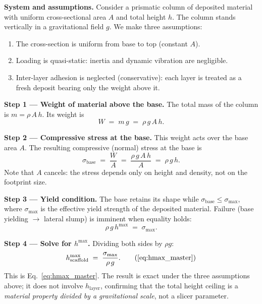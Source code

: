 \documentclass[11pt,a4paper]{article}
\begin{document}
\begin{derivationbox}[title={DERIVATION --- Self-weight force balance
for $h_\mathrm{scaffold}^{\max}$}]

\noindent\textbf{System and assumptions.}
Consider a prismatic column of deposited material with uniform
cross-sectional area $A$ and total height $h$.  The column stands
vertically in a gravitational field $g$.  We make three assumptions:
\begin{enumerate}[leftmargin=1.8em,itemsep=1pt]
  \item The cross-section is uniform from base to top (constant $A$).
  \item Loading is quasi-static: inertia and dynamic vibration are
    negligible.
  \item Inter-layer adhesion is neglected (conservative): each layer is
    treated as a fresh deposit bearing only the weight above it.
\end{enumerate}

\medskip\noindent\textbf{Step 1 --- Weight of material above the base.}
The total mass of the column is $m=\rho\,A\,h$.  Its weight is
\begin{equation}
W \;=\; m\,g \;=\; \rho\,g\,A\,h.
\end{equation}

\medskip\noindent\textbf{Step 2 --- Compressive stress at the base.}
This weight acts over the base area $A$.  The resulting compressive
(normal) stress at the base is
\begin{equation}
\sigma_\mathrm{base}
\;=\; \frac{W}{A}
\;=\; \frac{\rho\,g\,A\,h}{A}
\;=\; \rho\,g\,h.
\end{equation}
Note that $A$ cancels: the stress depends only on height and density,
not on the footprint size.

\medskip\noindent\textbf{Step 3 --- Yield condition.}
The base retains its shape while $\sigma_\mathrm{base}\leq\sigma_\mathrm{max}$,
where $\sigma_\mathrm{max}$ is the effective yield strength of the
deposited material.  Failure (base yielding $\to$ lateral slump) is
imminent when equality holds:
\begin{equation}
\rho\,g\,h^{\max} \;=\; \sigma_\mathrm{max}.
\end{equation}

\medskip\noindent\textbf{Step 4 --- Solve for $h^{\max}$.}
Dividing both sides by $\rho g$:
\begin{equation}
h_\mathrm{scaffold}^{\max}
\;=\; \frac{\sigma_\mathrm{max}}{\rho\,g}.
\tag{\ref{eq:hmax_master}}
\end{equation}
This is Eq.~\eqref{eq:hmax_master}.  The result is exact under the three
assumptions above; it does not involve $h_\mathrm{layer}$, confirming
that the total height ceiling is a \emph{material property divided by a
gravitational scale}, not a slicer parameter.


\end{derivationbox}
\end{document}
